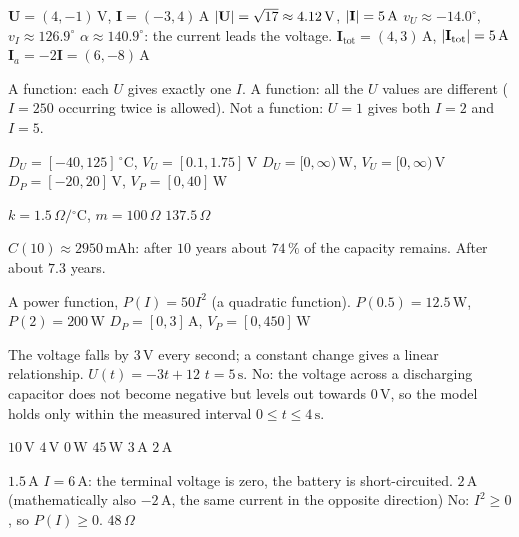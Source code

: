 
\begin{facit}

  $\mathbf{U} = (4, -1)\,\text{V}$, $\mathbf{I} = (-3, 4)\,\text{A}$
 $\lvert\mathbf{U}\rvert = \sqrt{17} \approx 4.12\,\text{V}$, $\lvert\mathbf{I}\rvert = 5\,\text{A}$
 $v_U \approx -14.0^{\circ}$, $v_I \approx 126.9^{\circ}$
 $\alpha \approx 140.9^{\circ}$: the current leads the voltage.
 $\mathbf{I}_{\text{tot}} = (4, 3)\,\text{A}$, $\lvert\mathbf{I}_{\text{tot}}\rvert = 5\,\text{A}$
 $\mathbf{I}_a = -2\mathbf{I} = (6, -8)\,\text{A}$

  A function: each $U$ gives exactly one $I$.
 A function: all the $U$ values are different ($I = 250$ occurring twice is allowed).
 Not a function: $U = 1$ gives both $I = 2$ and $I = 5$.

  $D_U = [-40, 125]\,^{\circ}\text{C}$, $V_U = [0.1, 1.75]\,\text{V}$
 $D_U = [0, \infty)\,\text{W}$, $V_U = [0, \infty)\,\text{V}$
 $D_P = [-20, 20]\,\text{V}$, $V_P = [0, 40]\,\text{W}$

  $k = 1.5\,\Omega/{}^{\circ}\text{C}$, $m = 100\,\Omega$
 $137.5\,\Omega$

  $C(10) \approx 2950\,\text{mAh}$: after $10$ years about $74\,\%$ of the capacity remains.
 After about $7.3$ years.

  A power function, $P(I) = 50I^2$ (a quadratic function).
 $P(0.5) = 12.5\,\text{W}$, $P(2) = 200\,\text{W}$
 $D_P = [0, 3]\,\text{A}$, $V_P = [0, 450]\,\text{W}$

  The voltage falls by $3\,\text{V}$ every second; a constant change gives a
linear relationship.
 $U(t) = -3t + 12$
 $t = 5\,\text{s}$. No: the voltage across a discharging capacitor does not become negative
but levels out towards $0\,\text{V}$, so the model holds only within the measured interval
$0 \leq t \leq 4\,\text{s}$.

  $10\,\text{V}$  $4\,\text{V}$  $0\,\text{W}$  $45\,\text{W}$  $3\,\text{A}$  $2\,\text{A}$

  $1.5\,\text{A}$  $I = 6\,\text{A}$: the terminal voltage is zero, the battery is short-circuited.
 $2\,\text{A}$ (mathematically also $-2\,\text{A}$, the same current in the opposite direction)
 No: $I^2 \geq 0$, so $P(I) \geq 0$.  $48\,\Omega$


\end{facit}
